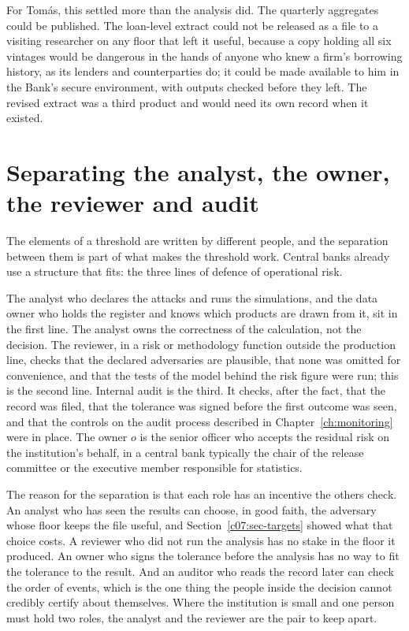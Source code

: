 For Tom\'as, this settled more than the analysis did. The quarterly aggregates could
be published. The loan-level extract could not be released as a file to a visiting
researcher on any floor that left it useful, because a copy holding all six
vintages would be dangerous in the hands of anyone who knew a firm's borrowing
history, as its lenders and counterparties do; it could be made available to
him in the Bank's secure environment, with outputs checked before they left. The
revised extract was a third product and would need its own record when it existed.

\section{Separating the analyst, the owner, the reviewer and audit}\label{c07:sec-roles}

The elements of a threshold are written by different people, and the separation
between them is part of what makes the threshold work. Central banks already use a
structure that fits: the three lines of defence of operational risk.

The analyst who declares the attacks and runs the simulations, and the data owner
who holds the register and knows which products are drawn from it, sit in the first
line. The analyst owns the correctness of the calculation, not the decision. The
reviewer, in a risk or methodology function outside the production line, checks
that the declared adversaries are plausible, that none was omitted for convenience,
and that the tests of the model behind the risk figure were run; this is the second
line. Internal audit is the third. It checks, after the fact, that the record was
filed, that the tolerance was signed before the first outcome was seen, and that
the controls on the audit process described in Chapter~\ref{ch:monitoring} were in
place. The owner $o$ is the senior officer who accepts the residual risk on the
institution's behalf, in a central bank typically the chair of the release
committee or the executive member responsible for statistics.

The reason for the separation is that each role has an incentive the others check.
An analyst who has seen the results can choose, in good faith, the adversary whose
floor keeps the file useful, and Section~\ref{c07:sec-targets} showed what that
choice costs. A reviewer who did not run the analysis has no stake in the floor it
produced. An owner who signs the tolerance before the analysis has no way to fit
the tolerance to the result. And an auditor who reads the record later can check
the order of events, which is the one thing the people inside the decision cannot
credibly certify about themselves. Where the institution is small and one person
must hold two roles, the analyst and the reviewer are the pair to keep apart.

